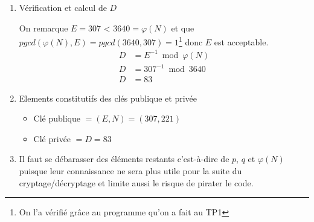\documentclass{homework}
\begin{document}
\begin{enumerate}
\begin{enumerate}
    			
    			\item Vérification et calcul de $D$
    			
    			On remarque $E = 307$ < $3640 = \varphi(N)$ et que $pgcd(\varphi(N),E) = pgcd(3640,307) = 1$\footnote[1]{On l'a vérifié grâce au programme qu'on a fait au TP1} donc $E$ est acceptable.
    				\begin{equation*}
    					\begin{split}    				
    				D & = E^{-1} \bmod \varphi(N) \\
   					D & = 307^{-1} \bmod 3640 \\
   					D & = 83
    					\end{split}
    				\end{equation*}
    				
    			\item Elements constitutifs des clés publique et privée
    				\begin{itemize}
    					\item Clé publique $= (E,N) = (307,221)$
    					\item Clé privée $= D = 83$
    				\end{itemize}
    			
    			
    			\item Il faut se débarasser des éléments restants c'est-à-dire de $p$, $q$ et $\varphi(N)$ puisque leur connaissance ne sera plus utile pour la suite du cryptage/décryptage et limite aussi le risque de pirater le code.
   			\end{enumerate}
		\end{enumerate}
\end{document}
